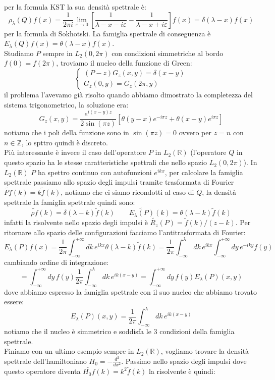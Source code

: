 \documentclass[12pt]{book}
\theoremstyle{plain}
\newcommand{\R}{\mathbb{R}}
\theoremstyle{definition}
\theoremstyle{remark}
\begin{document}
per la formula KST la sua densità spettrale è:
\[\rho_\lambda(Q)f(x) =  \frac{1}{2\pi i}\lim_{\varepsilon\to0}\left[\frac{1}{\lambda-x-i\varepsilon} - \frac{1}{\lambda-x+i\varepsilon} \right]f(x)  = \delta(\lambda-x)f(x)\]
per la formula di Sokhotski. La famiglia spettrale di conseguenza è $E_\lambda(Q)f(x) = \theta(\lambda-x)f(x)$.\\
Studiamo $P$ sempre in $L_2(0,2\pi)$ con condizioni simmetriche al bordo $f(0)=f(2\pi)$, troviamo il nucleo della funzione di Green:
\[\begin{cases}
(P-z)G_z(x,y) = \delta(x-y)\\
G_z(0,y) = G_z(2\pi,y)
\end{cases}\]
il problema l'avevamo già risolto quando abbiamo dimostrato la completezza del sistema trigonometrico, la soluzione era:
\[G_z(x,y) = \frac{e^{i(x-y)z}}{2\sin(\pi z)} \left[\theta(y-x)e^{-i\pi z} + \theta(x-y)e^{i\pi z}\right]\]
notiamo che i poli della funzione sono in $\sin(\pi z) = 0$ ovvero per $z=n$ con $n\in\mathbb{Z}$, lo spttro quindi è discreto.\\
Più interessante è invece il caso dell'operatore $P$ in $L_2(\R)$ (l'operatore $Q$ in questo spazio ha le stesse caratteristiche spettrali che nello spazio $L_2(0,2\pi)$). In $L_2(\R)$ $P$ ha spettro continuo con autofunzioni $e^{ikx}$, per calcolare la famiglia spettrale passiamo allo spazio degli impulsi tramite trasformata di Fourier $\widetilde{Pf}(k) = k\widetilde{f}(k)$, notiamo che ci siamo ricondotti al caso di $Q$, la densità spettrale la famiglia spettrale quindi sono:
\[\widetilde{\rho f}(k) = \delta(\lambda-k)\widetilde{f}(k) \qquad \widetilde{E_\lambda(P)}(k) = \theta(\lambda-k)\widetilde{f}(k) \]
infatti la risolvente nello spazio degli impulsi è $\widetilde{R_z}(P) = \widetilde{f}(k)/(z-k)$. Per ritornare allo spazio delle configurazioni facciamo l'antitrasformata di Fourier:
\[E_\lambda(P)f(x) = \frac{1}{2\pi}\int_{-\infty}^{+\infty}dk\, e^{ikx}\theta(\lambda-k)\widetilde{f}(k) =  \frac{1}{2\pi}\int_{-\infty}^{\lambda}dk\, e^{ikx}\int_{-\infty}^{+\infty}dy\, e^{-iky}f(y)\]
cambiando ordine di integrazione:
\[= \int_{-\infty}^{+\infty}dy\,f(y)\frac{1}{2\pi}\int_{-\infty}^{\lambda}dk\, e^{ik(x-y)} =\int_{-\infty}^{+\infty}dy\,f(y)E_\lambda(P)(x,y) \]
dove abbiamo espresso la famiglia spettrale con il suo nucleo che abbiamo trovato essere:
\[E_\lambda(P)(x,y) = \frac{1}{2\pi}\int_{-\infty}^{\lambda}dk\, e^{ik(x-y)}\]
notiamo che il nucleo è simmetrico e soddisfa le 3 condizioni della famiglia spettrale.\\
Finiamo con un ultimo esempio sempre in $L_2(\R)$, vogliamo trovare la densità spettrale dell'hamiltoniano $H_0 = -\frac{d^2}{dx^2}$. Passimo nello spazio degli impulsi dove questo operatore diventa $\widetilde{H_0f}(k) = k^2\widetilde{f}(k)$ la risolvente è quindi:
\end{document}
